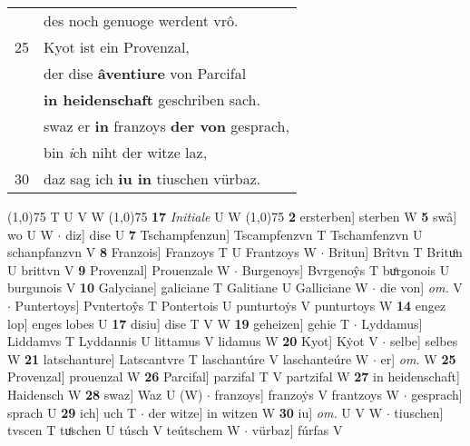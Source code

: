 \documentclass[8pt,a4paper,notitlepage]{article}
\begin{document}
\begin{table}[ht]
\begin{minipage}[t]{0.5\linewidth}
\begin{tabular}{rl}
 & des noch genuoge werdent vrô.\\ 
25 & Kyot ist ein Provenzal,\\ 
 & der dise \textbf{âventiure} von Parcifal\\ 
 & \textbf{in heidenschaft} geschriben sach.\\ 
 & swaz er \textbf{in} franzoys \textbf{der von} gesprach,\\ 
 & bin \textit{i}ch niht der witze laz,\\ 
30 & daz sag ich \textbf{iu in} tiuschen vürbaz.\\ 
\end{tabular}
\scriptsize
\line(1,0){75} \newline
T U V W \newline
\line(1,0){75} \newline
\textbf{17} \textit{Initiale} U W  \newline
\line(1,0){75} \newline
\textbf{2} ersterben] sterben W \textbf{5} swâ] wo U W  $\cdot$ diz] dise U \textbf{7} Tschampfenzun] Tscampfenzvn T Tschamfenzvn U schanpfanzvn V \textbf{8} Franzois] Franzoys T U Frantzoys W  $\cdot$ Britun] Brîtvn T Brituͦn U brittvn V \textbf{9} Provenzal] Prouenzale W  $\cdot$ Burgenoys] Bvrgenoŷs T buͦrgonois U burgunois V \textbf{10} Galyciane] galiciane T Galitiane U Galliciane W  $\cdot$ die von] \textit{om.} V  $\cdot$ Puntertoys] Pvntertoŷs T Pontertois U punturtoẏs V punturtoys W \textbf{14} engez lop] enges lobes U \textbf{17} disiu] dise T V W \textbf{19} geheizen] gehie T  $\cdot$ Lyddamus] Liddamvs T Lyddannis U littamus V lidamus W \textbf{20} Kyot] Kẏot V  $\cdot$ selbe] selbes W \textbf{21} latschanture] Latscantvre T laschantúre V laschanteúre W  $\cdot$ er] \textit{om.} W \textbf{25} Provenzal] prouenzal W \textbf{26} Parcifal] parzifal T V partzifal W \textbf{27} in heidenschaft] Haidensch W \textbf{28} swaz] Waz U (W)  $\cdot$ franzoys] franzoẏs V frantzoys W  $\cdot$ gesprach] sprach U \textbf{29} ich] uch T  $\cdot$ der witze] in witzen W \textbf{30} iu] \textit{om.} U V W  $\cdot$ tiuschen] tvscen T tuͦschen U túsch V teútschem W  $\cdot$ vürbaz] fúrfas V \newline
\end{minipage}
\end{table}
\end{document}
